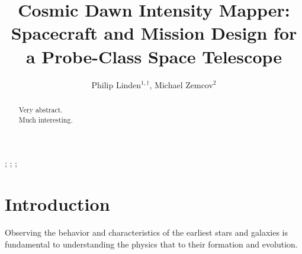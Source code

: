 \documentclass{ws-jai}
\begin{document}
\catchline{}{}{}{}{} %


\title{Cosmic Dawn Intensity Mapper: \\Spacecraft and Mission Design for a Probe-Class Space Telescope}

\author{Philip Linden$^{1,\dagger}$, Michael Zemcov$^{2}$}

\address{
$^1$Department of Mechanical Engineering, Kate Gleason College of Engineering, Rochester
Institute of Technology, Rochester, NY 14623, USA, pjl7651@rit.edu\\
$^1$Center for Detectors, School of Physics and Astronomy, Rochester
Institute of Technology, Rochester, NY 14623, USA, zemcov@cfd.rit.edu\\
}

\maketitle


\begin{history}
;
;
;
\end{history}

\begin{abstract}
  Very abstract.\\
  Much interesting.
\end{abstract}


\section{Introduction}
\label{S:introduction}
Observing the behavior and characteristics of the earliest stars and galaxies is fundamental to understanding the physics that to their formation and evolution.
\end{document}
